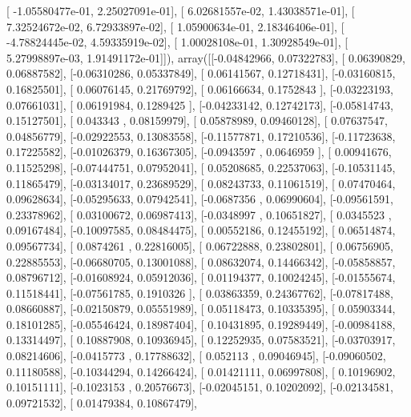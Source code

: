 \documentclass{article}
\begin{document}
       [ -1.05580477e-01,   2.25027091e-01],
       [  6.02681557e-02,   1.43038571e-01],
       [  7.32524672e-02,   6.72933897e-02],
       [  1.05900634e-01,   2.18346406e-01],
       [ -4.78824445e-02,   4.59335919e-02],
       [  1.00028108e-01,   1.30928549e-01],
       [  5.27998897e-03,   1.91491172e-01]]), array([[-0.04842966,  0.07322783],
       [ 0.06390829,  0.06887582],
       [-0.06310286,  0.05337849],
       [ 0.06141567,  0.12718431],
       [-0.03160815,  0.16825501],
       [ 0.06076145,  0.21769792],
       [ 0.06166634,  0.1752843 ],
       [-0.03223193,  0.07661031],
       [ 0.06191984,  0.1289425 ],
       [-0.04233142,  0.12742173],
       [-0.05814743,  0.15127501],
       [ 0.043343  ,  0.08159979],
       [ 0.05878989,  0.09460128],
       [ 0.07637547,  0.04856779],
       [-0.02922553,  0.13083558],
       [-0.11577871,  0.17210536],
       [-0.11723638,  0.17225582],
       [-0.01026379,  0.16367305],
       [-0.0943597 ,  0.0646959 ],
       [ 0.00941676,  0.11525298],
       [-0.07444751,  0.07952041],
       [ 0.05208685,  0.22537063],
       [-0.10531145,  0.11865479],
       [-0.03134017,  0.23689529],
       [ 0.08243733,  0.11061519],
       [ 0.07470464,  0.09628634],
       [-0.05295633,  0.07942541],
       [-0.0687356 ,  0.06990604],
       [-0.09561591,  0.23378962],
       [ 0.03100672,  0.06987413],
       [-0.0348997 ,  0.10651827],
       [ 0.0345523 ,  0.09167484],
       [-0.10097585,  0.08484475],
       [ 0.00552186,  0.12455192],
       [ 0.06514874,  0.09567734],
       [ 0.0874261 ,  0.22816005],
       [ 0.06722888,  0.23802801],
       [ 0.06756905,  0.22885553],
       [-0.06680705,  0.13001088],
       [ 0.08632074,  0.14466342],
       [-0.05858857,  0.08796712],
       [-0.01608924,  0.05912036],
       [ 0.01194377,  0.10024245],
       [-0.01555674,  0.11518441],
       [-0.07561785,  0.1910326 ],
       [ 0.03863359,  0.24367762],
       [-0.07817488,  0.08660887],
       [-0.02150879,  0.05551989],
       [ 0.05118473,  0.10335395],
       [ 0.05903344,  0.18101285],
       [-0.05546424,  0.18987404],
       [ 0.10431895,  0.19289449],
       [-0.00984188,  0.13314497],
       [ 0.10887908,  0.10936945],
       [ 0.12252935,  0.07583521],
       [-0.03703917,  0.08214606],
       [-0.0415773 ,  0.17788632],
       [ 0.052113  ,  0.09046945],
       [-0.09060502,  0.11180588],
       [-0.10344294,  0.14266424],
       [ 0.01421111,  0.06997808],
       [ 0.10196902,  0.10151111],
       [-0.1023153 ,  0.20576673],
       [-0.02045151,  0.10202092],
       [-0.02134581,  0.09721532],
       [ 0.01479384,  0.10867479],
\end{document}
